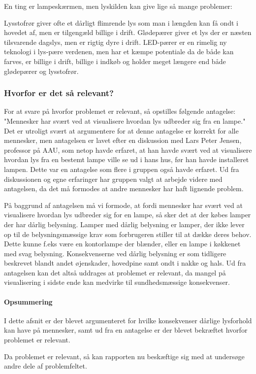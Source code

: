 En ting er lampeskærmen, men lyskilden kan give lige så mange problemer:

Lysstofrør giver ofte et dårligt flimrende lys som man i længden kan få ondt i hovedet af, men er tilgengæld billige i drift. Glødepærer giver et lys der er næsten tilsvarende dagslys, men er rigtig dyre i drift. LED-pærer er en rimelig ny teknologi i lys-pære verdenen, men har et kæmpe potentiale da de både kan farves, er billige i drift, billige i indkøb og holder meget længere end både glødepærer og lysstofrør\cite{videnskab_dk_led}.


\subsubsection{Hvorfor er det så relevant?}

For at svare på hvorfor problemet er relevant, så opstilles følgende antagelse: "Mennesker har svært ved at visualisere hvordan lys udbreder sig fra en lampe." Det er utroligt svært at argumentere for at denne antagelse er korrekt for alle mennesker, men antagelsen er lavet efter en diskussion med Lars Peter Jensen, professor på AAU, som netop havde erfaret, at han havde svært ved at visualisere hvordan lys fra en bestemt lampe ville se ud i hans hus, før han havde installeret lampen. Dette var en antagelse som flere i gruppen også havde erfaret. Ud fra diskussionen og egne erfaringer har gruppen valgt at arbejde videre med antagelsen, da det må formodes at andre mennesker har haft lignende problem. 

På baggrund af antagelsen må vi formode, at fordi mennesker har svært ved at visualisere hvordan lys udbreder sig for en lampe, så sker det at der købes lamper der har dårlig belysning. Lamper med dårlig belysning er lamper, der ikke lever op til de belysningsmæssige krav som forbrugeren stiller til at dække deres behov. Dette kunne f.eks være en kontorlampe der blænder, eller en lampe i køkkenet med svag belysning\cite{daarlig_belysning_konsekvenser}. Konsekvenserne ved dårlig belysning er som tidligere beskrevet blandt andet øjenskader, hovedpine samt ondt i nakke og hals. Ud fra antagelsen kan det altså uddrages at problemet er relevant, da mangel på visualisering i sidste ende kan medvirke til sundhedsmæssige konsekvenser.

\paragraph{Opsummering}

I dette afsnit er der blevet argumenteret for hvilke konsekvenser dårlige lysforhold kan have på mennesker, samt ud fra en antagelse er der blevet bekræftet hvorfor problemet er relevant. 

Da problemet er relevant, så kan rapporten nu beskæftige sig med at undersøge andre dele af problemfeltet. 
